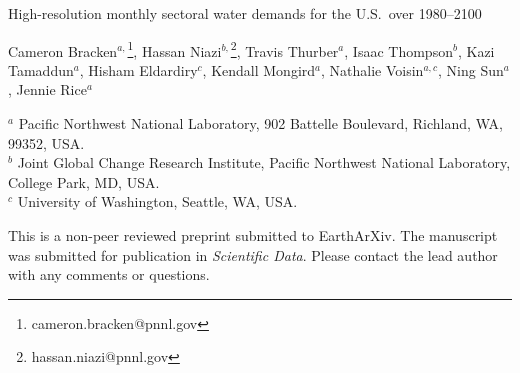 \documentclass[a4paper]{article}
\begin{document}

\Large
 \begin{center}
High-resolution monthly sectoral water demands for the U.S.\ over 1980--2100\\

\hspace{10pt}

\large
Cameron Bracken$^{a,}$\footnote{cameron.bracken@pnnl.gov},
Hassan Niazi$^{b,}$\footnote{hassan.niazi@pnnl.gov},
Travis Thurber$^{a}$,
Isaac Thompson$^{b}$,
Kazi Tamaddun$^{a}$,
Hisham Eldardiry$^{c}$,
Kendall Mongird$^{a}$,
Nathalie Voisin$^{a,c}$,
Ning Sun$^{a}$,
Jennie Rice$^{a}$ \\

\hspace{10pt}

\small
$^a$ Pacific Northwest National Laboratory, 902 Battelle Boulevard, Richland, WA, 99352, USA.\\
$^b$ Joint Global Change Research Institute, Pacific Northwest National Laboratory, College Park, MD, USA.\\
$^c$ University of Washington, Seattle, WA, USA.

\end{center}

\normalsize

This is a non-peer reviewed preprint submitted to EarthArXiv. The manuscript was submitted for publication in \textit{Scientific Data}. Please contact the lead author with any comments or questions.
\end{document}
